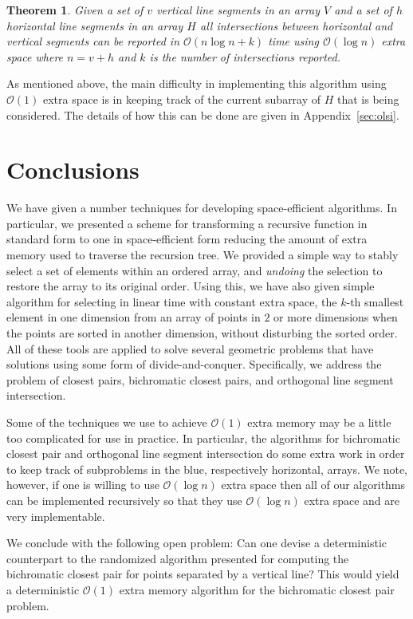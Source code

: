 \documentclass{elsart}
\newcommand{\Oh}[1]{\ensuremath{\mathcal{O}(#1)}}
\newtheorem{theorem}{Theorem}
\begin{document}
\begin{theorem} 
Given a set of $v$ vertical line segments in an array
$V$ and a set of $h$ horizontal line segments in an array $H$
all intersections between horizontal and vertical segments
can be reported in \Oh{n\log n+k} time using \Oh{\log n} extra space
where $n=v+h$ and $k$ is the number of intersections reported.  
\end{theorem}

As mentioned above, the main difficulty in implementing this algorithm
using $\Oh{1}$ extra space is in keeping track of the current subarray
of $H$ that is being considered.  The details of how this can be done
are given in Appendix~\ref{sec:olsi}.


\section{Conclusions}\label{sec:conc}

We have given a number techniques for developing space-efficient
algorithms.  In particular, we presented a scheme for transforming a
recursive function in standard form to one in space-efficient form
reducing the amount of extra memory used to traverse the recursion
tree.  We provided a simple way to stably select a set of elements
within an ordered array, and {\em undoing} the selection to restore
the array to its original order.  Using this, we have also given
simple algorithm for selecting in linear time with constant extra
space, the $k$-th smallest element in one dimension from an array of
points in $2$ or more dimensions when the points are sorted in another
dimension, without disturbing the sorted order.  All of these tools
are applied to solve several geometric problems that have solutions
using some form of divide-and-conquer.  Specifically, we address the
problem of closest pairs, bichromatic closest pairs, and
orthogonal line segment intersection.

Some of the techniques we use to achieve \Oh{1} extra memory may
be a little too complicated for use in practice.  In particular, the
algorithms for bichromatic closest pair and orthogonal line segment
intersection do some extra work in order to keep track of subproblems
in the blue, respectively horizontal, arrays. We note, however, if one
is willing to use \Oh{\log n} extra space then all of our algorithms
can be implemented recursively so that they use \Oh{\log n} extra
space and are very implementable.

We conclude with the following open problem: Can one devise a
deterministic counterpart to the randomized algorithm presented for
computing the bichromatic closest pair for points separated by a
vertical line?  This would yield a deterministic \Oh{1} extra memory
algorithm for the bichromatic closest pair problem.




\appendix


\end{document}
